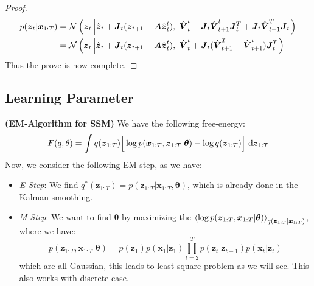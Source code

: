 \begin{proof}
\begin{equation*}
    \begin{aligned}
        p(\boldsymbol z_t | \boldsymbol x_{1:T}) 
        &= \mathcal{N}\left( \boldsymbol z_t \left| \hat{\boldsymbol z}_t +  \boldsymbol J_t(\boldsymbol z_{t+1} - \boldsymbol A\hat{\boldsymbol z}^t_{t}), \ \hat{\boldsymbol V}^t_t - \boldsymbol J_t\hat{\boldsymbol V}^t_{t+1} \boldsymbol J_t^T + \boldsymbol J_t\hat{\boldsymbol V}^T_{t+1}\boldsymbol J_t \right. \right) \\
        &= \mathcal{N}\left( \boldsymbol z_t \left| \hat{\boldsymbol z}_t +  \boldsymbol J_t(\boldsymbol z_{t+1} - \boldsymbol A\hat{\boldsymbol z}^t_{t}), \ \hat{\boldsymbol V}^t_t + \boldsymbol J_t(\hat{\boldsymbol V}^T_{t+1}-\hat{\boldsymbol V}^t_{t+1}) \boldsymbol J_t^T\right. \right) 
    \end{aligned}
    \end{equation*}
    Thus the prove is now complete. 
\end{proof}

\subsection{Learning Parameter}

\begin{definition}{\textbf{(EM-Algorithm for SSM)}}
    We have the following free-energy:
    \begin{equation*}
        F(q, \theta) = \int q(\boldsymbol z_{1:T})\Big[ \log p(\boldsymbol x_{1:T}, \boldsymbol z_{1:T} | \boldsymbol \theta) - \log q(\boldsymbol z_{1:T}) \Big]\ \mathrm{d} \boldsymbol z_{1:T}
    \end{equation*}
    Now, we consider the following EM-step, as we have:
    \begin{itemize}
        \item \emph{E-Step}: We find $q^*(\boldsymbol z_{1:T}) = p(\boldsymbol z_{1:T} | \boldsymbol x_{1:T}, \boldsymbol \theta)$, which is already done in the Kalman smoothing.
        \item \emph{M-Step}: We want to find $\boldsymbol \theta$ by maximizing the $\left\langle \log p(\boldsymbol z_{1:T}, \boldsymbol x_{1:T} | \boldsymbol \theta) \right\rangle_{q(\boldsymbol z_{1:T} | \boldsymbol x_{1:T})}$, where we have:
        \begin{equation*}
            p(\boldsymbol z_{1:T}, \boldsymbol x_{1:T}|\boldsymbol \theta) = p(\boldsymbol z_1)p(\boldsymbol x_1|\boldsymbol z_1)\prod^T_{t=2}p(\boldsymbol z_t|\boldsymbol z_{t-1})p(\boldsymbol x_t|\boldsymbol z_t)
        \end{equation*}
        which are all Gaussian, this leads to least square problem as we will see. This also works with discrete case.
    \end{itemize}
\end{definition}

